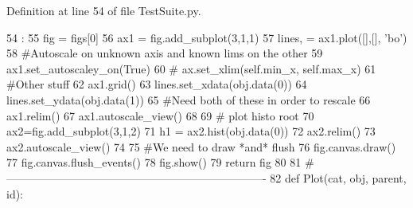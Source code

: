 Definition at line 54 of file TestSuite.py.


\begin{DoxyCode}
54                           :
55     fig = figs[0]
56     ax1 = fig.add_subplot(3,1,1)
57     lines, = ax1.plot([],[], 'bo')
58     #Autoscale on unknown axis and known lims on the other
59     ax1.set_autoscaley_on(True)
60 #    ax.set_xlim(self.min_x, self.max_x)
61     #Other stuff
62     ax1.grid()        
63     lines.set_xdata(obj.data(0))
64     lines.set_ydata(obj.data(1))
65     #Need both of these in order to rescale
66     ax1.relim()
67     ax1.autoscale_view()
68 
69     # plot histo root
70     ax2=fig.add_subplot(3,1,2)
71     h1 = ax2.hist(obj.data(0))
72     ax2.relim()
73     ax2.autoscale_view()
74 
75     #We need to draw *and* flush
76     fig.canvas.draw()
77     fig.canvas.flush_events()
78     fig.show()
79     return fig
80     
81 #----------------------------------------------------------------------
82 
def Plot(cat, obj, parent, id):
\end{DoxyCode}
